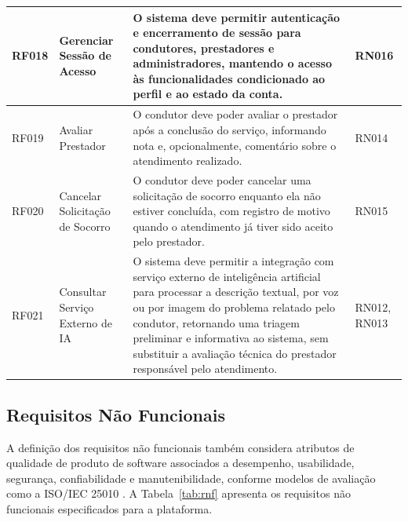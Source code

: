 \documentclass[12pt, a4paper]{article}
\begin{document}
{\begin{longtable}{|>{\raggedright\arraybackslash}p{}|>{\raggedright\arraybackslash}p{}|>{\raggedright\arraybackslash}p{}|>{\raggedright\arraybackslash}p{}|}
RF018 & Gerenciar Sessão de Acesso & O sistema deve permitir autenticação e encerramento de sessão para condutores, prestadores e administradores, mantendo o acesso às funcionalidades condicionado ao perfil e ao estado da conta. & RN016 \\ \hline
RF019 & Avaliar Prestador & O condutor deve poder avaliar o prestador após a conclusão do serviço, informando nota e, opcionalmente, comentário sobre o atendimento realizado. & RN014 \\ \hline
RF020 & Cancelar Solicitação de Socorro & O condutor deve poder cancelar uma solicitação de socorro enquanto ela não estiver concluída, com registro de motivo quando o atendimento já tiver sido aceito pelo prestador. & RN015 \\ \hline
RF021 & Consultar Serviço Externo de IA & O sistema deve permitir a integração com serviço externo de inteligência artificial para processar a descrição textual, por voz ou por imagem do problema relatado pelo condutor, retornando uma triagem preliminar e informativa ao sistema, sem substituir a avaliação técnica do prestador responsável pelo atendimento. & RN012, RN013 \\ \hline
\end{longtable}
}

\subsection{Requisitos Não Funcionais}

A definição dos requisitos não funcionais também considera atributos de qualidade de produto de software associados a desempenho, usabilidade, segurança, confiabilidade e manutenibilidade, conforme modelos de avaliação como a ISO/IEC 25010 \cite{iso25010_2023}. A Tabela~\ref{tab:rnf} apresenta os requisitos não funcionais especificados para a plataforma.
\end{document}

